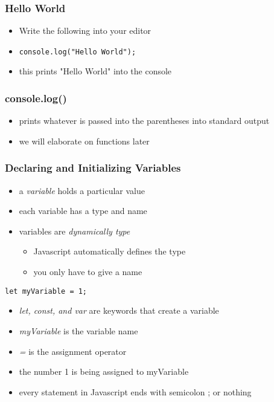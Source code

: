 \documentclass{beamer}
\begin{document}
\begin{frame}[fragile]
	\frametitle{Hello World}
\begin{itemize}
	\item Write the following into your editor
	\item \begin{lstlisting}
console.log("Hello World");
\end{lstlisting}

\end{itemize}
\begin{itemize}
	\item this prints "Hello World" into the console
\end{itemize}
\end{frame}

\begin{frame}
\frametitle{console.log()}
\begin{itemize}
	\item prints whatever is passed into the parentheses into standard output
	\item we will elaborate on functions later
\end{itemize}
\end{frame}

\begin{frame}[fragile]
\frametitle{Declaring and Initializing Variables}
\begin{itemize}
\item a \emph{variable} holds a particular value
\item each variable has a type and name
\item variables are \emph{dynamically type}
	\begin{itemize}
		\item Javascript automatically defines the type
		\item you only have to give a name
	\end{itemize}

\end{itemize}
\begin{lstlisting}
let myVariable = 1;
\end{lstlisting}
\begin{itemize}
	\item \emph{let, const, and var} are keywords that create a variable
	\item \emph{myVariable} is the variable name
	\item \emph{=} is the assignment operator
	\item the number 1 is being assigned to myVariable
	\item every statement in Javascript ends with semicolon ; or nothing
\end{itemize}
\end{frame}
\end{document}
